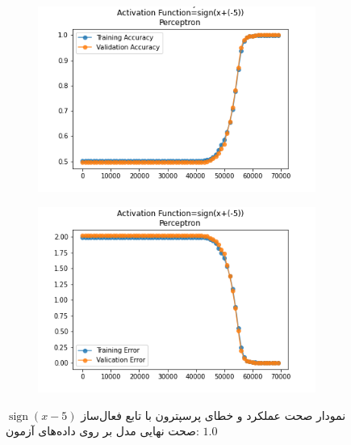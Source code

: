 \documentclass[12pt, a4paper]{article}
\DeclareMathOperator{\sign}{sign}
\begin{document}
\begin{figure}[h]
    \begin{subfigure}{0.45\linewidth}
        \centering
        \includegraphics[width=\linewidth]{images/3/perceptron/activation_func/5.png}
    \end{subfigure}
    \hfil
    \begin{subfigure}{0.45\linewidth}
        \centering
        \includegraphics[width=\linewidth]{images/3/perceptron/activation_func/6.png}
    \end{subfigure}
    \caption{نمودار صحت عملکرد‌ و خطای پرسپترون با تابع فعال‌ساز $\sign(x-5)$
    \newline
    صحت نهایی مدل بر روی داده‌های آزمون: $1.0$}
\end{figure}
\end{document}
